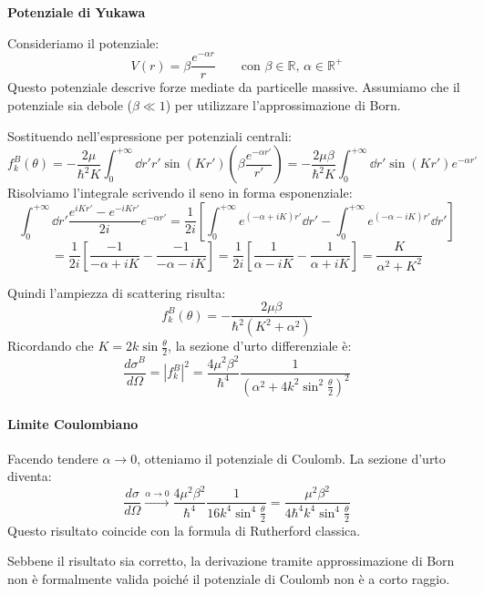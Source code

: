 \begin{example}
    \textbf{Potenziale di Yukawa}

    Consideriamo il potenziale:
    \[
        V(r) = \beta \frac{e^{-\alpha r}}{r} \qquad \text{con } \beta \in \mathbb{R}, \, \alpha \in \mathbb{R}^+
    \]
    Questo potenziale descrive forze mediate da particelle massive.
    Assumiamo che il potenziale sia debole (\( \beta \ll 1 \)) per utilizzare l'approssimazione di Born.

    Sostituendo nell'espressione per potenziali centrali:
    \[
        f_k^B(\theta) = -\frac{2\mu}{\hbar^2 K} \int_0^{+\infty} \dd{r'} r' \sin(Kr') \left( \beta \frac{e^{-\alpha r'}}{r'} \right) = -\frac{2\mu \beta}{\hbar^2 K} \int_0^{+\infty} \dd{r'} \sin(Kr') e^{-\alpha r'}
    \]
    Risolviamo l'integrale scrivendo il seno in forma esponenziale:
    \[
        \int_0^{+\infty} \dd{r'} \frac{e^{iKr'} - e^{-iKr'}}{2i} e^{-\alpha r'} = \frac{1}{2i} \left[ \int_0^{+\infty} e^{(-\alpha+iK)r'} \dd{r'} - \int_0^{+\infty} e^{(-\alpha-iK)r'} \dd{r'} \right]
    \]
    \[
        = \frac{1}{2i} \left[ \frac{-1}{-\alpha+iK} - \frac{-1}{-\alpha-iK} \right] = \frac{1}{2i} \left[ \frac{1}{\alpha-iK} - \frac{1}{\alpha+iK} \right] = \frac{K}{\alpha^2 + K^2}
    \]
    
    Quindi l'ampiezza di scattering risulta:
    \begin{equation}
        f_k^B(\theta) = -\frac{2\mu \beta}{\hbar^2 (K^2 + \alpha^2)}
    \end{equation}
    Ricordando che \( K = 2k \sin\frac{\theta}{2} \), la sezione d'urto differenziale è:
    \begin{equation}
        \frac{d\sigma^B}{d\Omega} = |f_k^B|^2 = \frac{4\mu^2 \beta^2}{\hbar^4} \frac{1}{(\alpha^2 + 4k^2 \sin^2\frac{\theta}{2})^2}
    \end{equation}

    \paragraph{Limite Coulombiano}
    Facendo tendere \( \alpha \to 0 \), otteniamo il potenziale di Coulomb. La sezione d'urto diventa:
    \[
        \frac{d\sigma}{d\Omega} \xrightarrow{\alpha \to 0} \frac{4\mu^2 \beta^2}{\hbar^4} \frac{1}{16 k^4 \sin^4\frac{\theta}{2}} = \frac{\mu^2 \beta^2}{4\hbar^4 k^4 \sin^4\frac{\theta}{2}}
    \]
    Questo risultato coincide con la formula di Rutherford classica.
    \begin{attention}
        Sebbene il risultato sia corretto, la derivazione tramite approssimazione di Born non è formalmente valida poiché il potenziale di Coulomb non è a corto raggio.
    \end{attention}


\end{example}
